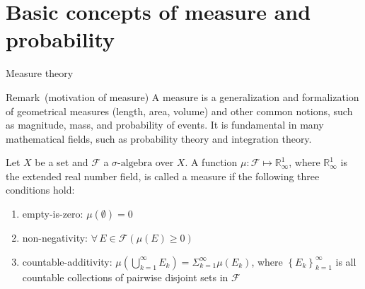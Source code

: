 \documentclass[utf-8, 10pt, aspectratio=1610]{beamer}
\begin{document}
\section{Basic concepts of measure and probability}
\begin{frame}[allowframebreaks]{Measure theory}
	\vspace*{\fill}
	\begin{block}{Remark\ (motivation of measure)}
		A measure is a generalization and formalization of geometrical measures (length, area, volume) and other common notions, such as magnitude, mass, and probability of events. It is fundamental in many mathematical fields, such as probability theory and integration theory.
	\end{block}

	\vspace*{\fill}

	\begin{definition}[measure]
		Let \(X\) be a set and \(\mathcal{F}\) a \(\sigma \text{-algebra} \) over \(X\). A function \(\mu:\mathcal{F}\mapsto \mathbb{R}_{\infty}^{1}\), where \(\mathbb{R}_{\infty}^{1}\) is the extended real number field, is called a measure if the following three conditions hold:
		\begin{enumerate}
			\item empty-is-zero: \(\mu \left(\emptyset\right) = 0\)
			\item non-negativity: \(\forall\, E \in \mathcal{F} \left( \mu\left(E\right) \geq 0 \right) \)
			\item countable-additivity: \(\mu\left(\bigcup_{k=1}^{\infty} E_k\right) = \Sigma_{k=1}^{\infty} \mu \left(E_k\right)\), where \(\left\{E_k\right\}^{\infty}_{k=1} \) is all countable collections of pairwise disjoint sets in \(\mathcal{F}\)
		\end{enumerate}
	\end{definition}\label{def:measure}

	\vspace*{\fill}
	\framebreak
	\vspace*{\fill}


\end{frame}
\end{document}
